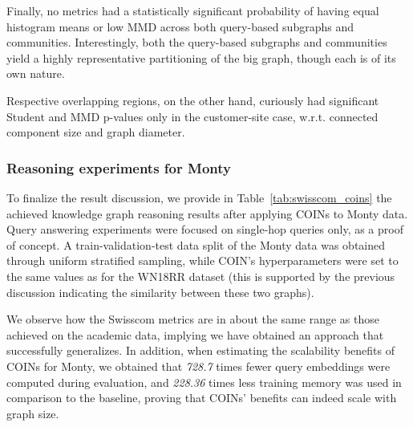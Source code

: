 Finally, no metrics had a statistically significant probability of having equal histogram means or low MMD across both query-based subgraphs and communities. Interestingly, both the query-based subgraphs and communities yield a highly representative partitioning of the big graph, though each is of its own nature. 

Respective overlapping regions, on the other hand, curiously had significant Student and MMD p-values only in the customer-site case, w.r.t. connected component size and graph diameter.

\subsubsection{Reasoning experiments for Monty}

To finalize the result discussion, we provide in Table~\ref{tab:swisscom_coins} the achieved knowledge graph reasoning results after applying COINs to Monty data. Query answering experiments were focused on single-hop queries only, as a proof of concept. A train-validation-test data split of the Monty data was obtained through uniform stratified sampling, while COIN's hyperparameters were set to the same values as for the WN18RR dataset (this is supported by the previous discussion indicating the similarity between these two graphs). 

We observe how the Swisscom metrics are in about the same range as those achieved on the academic data, implying we have obtained an approach that successfully generalizes. In addition, when estimating the scalability benefits of COINs for Monty, we obtained that \emph{728.7} times fewer query embeddings were computed during evaluation, and \emph{228.36} times less training memory was used in comparison to the baseline, proving that COINs' benefits can indeed scale with graph size.

